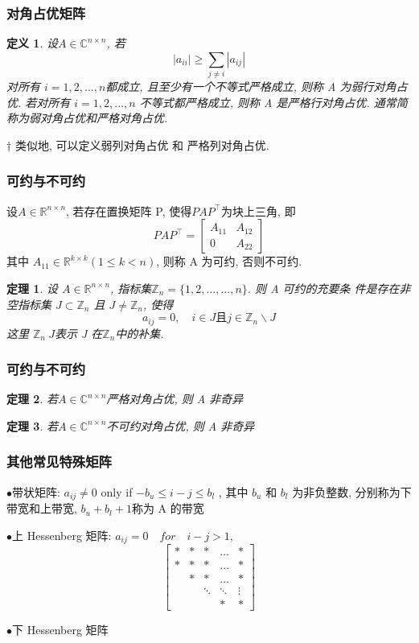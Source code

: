 \documentclass[notheorems,serif]{beamer}
\newcommand{\hei}[1]{{\HEI#1}}
\newtheorem{theorem}{\hei{定理}}
\newtheorem{definition}{\hei{定义}}
\begin{document}
\begin{frame}
\frametitle{对角占优矩阵}
\begin{definition}
	设$ A ∈\mathbb{C}^{n×n}$, 若
	$$
	\left|a_{i i}\right| \geq \sum_{j \neq i}\left|a_{i j}\right|
	$$
	对所有 $i = 1, 2, . . . , n $都成立, 且至少有一个不等式严格成立, 则称 A
	为弱行对角占优. 若对所有 $i = 1, 2, . . . , n$ 不等式都严格成立, 则称 A
	是严格行对角占优. 通常简称为弱对角占优和严格对角占优.	
\end{definition}

† 类似地, 可以定义弱列对角占优 和 严格列对角占优.
\end{frame}

\begin{frame}
\frametitle{可约与不可约}
设$A \in \mathbb{R}^{n \times n}$, 若存在置换矩阵 P, 使得$P A P^{\top}$为块上三角, 即
$$
P A P^{\top}=\left[\begin{array}{cc}{A_{11}} & {A_{12}} \\ {0} & {A_{22}}\end{array}\right]
$$
其中 $A_{11} \in \mathbb{R}^{k \times k}(1 \leq k<n)$, 则称 A 为可约, 否则不可约.

\begin{theorem}
	设 $A \in \mathbb{R}^{n \times n}$, 指标集$\mathbb{Z}_{n}=\{1,2, \ldots, \ldots, n\}$. 则 A 可约的充要条
	件是存在非空指标集 $J \subset \mathbb{Z}_{n}$ 且 $J \neq \mathbb{Z}_{n}$, 使得
	$$
	a_{i j}=0, \quad i \in J \text{且} j \in \mathbb{Z}_{n} \backslash J
	$$
	这里 $\mathbb{Z}_n \ J $表示 J 在$ \mathbb{Z}_n $中的补集.	
\end{theorem}
\end{frame}

\begin{frame}
\frametitle{可约与不可约}
\begin{theorem}
	若$A \in \mathbb{C}^{n \times n}$严格对角占优, 则 A 非奇异	
\end{theorem}

\begin{theorem}
	若$A \in \mathbb{C}^{n \times n}$不可约对角占优, 则 A 非奇异	
\end{theorem}
\end{frame}

\begin{frame}
\frametitle{其他常见特殊矩阵}
$\bullet$带状矩阵:
$a_{i j} \neq 0$ only if $-b_{u} \leq i-j \leq b_{l}$
, 其中 $b_u$ 和 $b_l$ 为非负整数, 分别称为下
带宽和上带宽, $b_u + b_l + 1 $称为 A 的带宽

$\bullet$上 Hessenberg 矩阵: $a_{ij} = 0\quad for\quad i − j > 1$,
$$
\left[\begin{array}{ccccc}{*} & {*} & {*} & {\dots} & {*} \\ {*} & {*} & {*} & {\dots} & {*} \\ { } & {*} & {*} & {\dots} & {*} \\ { } & { } & {\ddots} & {\ddots} & {\vdots}\\ { } & { } & { } & {*} & {*}\end{array}\right]
$$

$\bullet$下 Hessenberg 矩阵
\end{frame}
\end{document}
